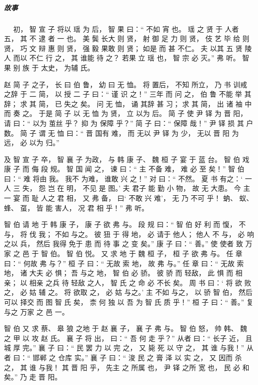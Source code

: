 \documentclass[UTF8,a4paper,8pt]{ctexbook}
\begin{document}
			\subparagraph{故事}
				　 初， 智 宣 子 将以 瑶 为 后， 智 果 曰：“ 不如 宵 也。 瑶 之 贤 于 人者 五， 其 不 逮 者 一 也。 美 鬓 长大 则 贤， 射 御 足 力 则 贤， 伎 艺 毕 给 则 贤， 巧 文 辩 惠 则 贤， 强 毅 果敢 则 贤； 如是 而 甚 不仁。 夫 以其 五 贤 陵 人 而以 不仁 行 之， 其 谁能 待 之？ 若果 立 瑶 也， 智 宗 必 灭。” 弗 听。 智 果 别 族 于 太史， 为辅 氏。
				
				  赵 简 子 之子， 长 曰 伯 鲁， 幼 曰 无 恤。 将 置后， 不知 所立， 乃 书 训戒 之辞 于 二 简， 以 授 二 子 曰：“ 谨 识 之！” 三年 而 问 之， 伯 鲁 不能 举 其辞； 求 其 简， 已 失之 矣。 问 无 恤， 诵 其辞 甚 习； 求 其 简， 出 诸 袖 中 而 奏 之。 于是 简 子 以 无 恤 为 贤， 立 以为 后。 简 子 使 尹 铎 为 晋 阳， 请 曰：“ 以为 茧丝 乎？ 抑 为 保障 乎？” 简 子 曰：“ 保障 哉！” 尹 铎 损 其 户数。 简 子 谓 无 恤 曰：“ 晋 国有 难， 而 无以 尹 铎 为 少， 无以 晋 阳 为 远， 必 以为 归。” 
				  
				  及 智 宣 子 卒， 智 襄 子 为政， 与 韩 康 子、 魏 桓 子 宴 于 蓝 台。 智 伯 戏 康 子 而 侮 段 规。 智 国 闻 之， 谏 曰：“ 主 不备 难， 难 必 至 矣！” 智 伯 曰：“ 难 将由 我。 我不 为难， 谁敢 兴 之！” 对 曰：“ 不然。 夏 书 有之：‘ 一人 三 失， 怨 岂 在 明， 不见 是 图。’ 夫 君子 能 勤 小 物， 故 无 大患。 今 主 一 宴 而 耻 人之 君 相， 又 弗 备， 曰‘ 不敢 兴 难’， 无 乃 不可 乎！ 蚋、 蚁、 蜂、 虿， 皆 能 害人， 况 君 相 乎！” 弗 听。 
				  
				  智 伯 请 地 于 韩 康 子， 康 子 欲 弗 与。 段 规 曰：“ 智 伯 好 利 而 愎， 不 与， 将 伐 我； 不如 与之。 彼 狃 于 得 地， 必 请于 他人； 他人 不 与， 必 响 之以 兵， 然后 我得 免于 患 而 待 事 之 变 矣。” 康 子 曰：“ 善。” 使 使者 致 万家 之 邑 于 智 伯。 智 伯 悦。 又 求 地 于 魏 桓 子， 桓 子 欲 弗 与。 任 章 曰：“ 何故 弗 与？” 桓 子 曰：“ 无故 索 地， 故 弗 与。” 任 章 曰：“ 无故 索 地， 诸 大夫 必 惧； 吾 与之 地， 智 伯 必 骄。 彼 骄 而 轻敌， 此 惧 而 相亲； 以 相亲 之兵 待 轻敌 之人， 智 氏 之 命 必 不长 矣。 周 书 曰：‘ 将 欲 败 之， 必 姑 辅 之。 将 欲取 之， 必 姑 与之。’ 主 不如 与之， 以 骄 智 伯， 然后 可以 择交 而 图 智 氏 矣， 柰 何 独 以 吾 为 智 氏 质 乎！” 桓 子 曰：“ 善。” 复 与之 万家 之 邑 一。 
				  
				  智 伯 又 求 蔡、 皋 狼 之地 于 赵 襄 子， 襄 子 弗 与。 智 伯 怒， 帅 韩、 魏 之 甲 以 攻 赵 氏。 襄 子 将 出， 曰：“ 吾 何 走 乎？” 从者 曰：“ 长子 近， 且 城 厚 完。” 襄 子 曰：“ 民 罢 力 以 完 之， 又 毙 死 以 守 之， 其 谁 与我！” 从者 曰：“ 邯郸 之 仓库 实。” 襄 子 曰：“ 浚 民 之 膏 泽 以 实 之， 又 因而 杀 之， 其 谁 与我！ 其 晋 阳 乎， 先主 之 所属 也， 尹 铎 之所 宽 也， 民 必 和 矣。” 乃 走 晋 阳。 
				  
\end{document}

